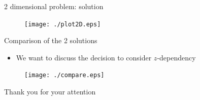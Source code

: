 \documentclass{beamer}
\begin{document}
\begin{frame}{2 dimensional problem: solution}

\begin{figure}[!h]
\centering
\texttt{[image: ./plot2D.eps]}
\end{figure}

\end{frame}


\begin{frame}{Comparison of the 2 solutions}
\begin{itemize}
\item We want to discuss the decision to consider $z$-dependency
\end{itemize}

\begin{figure}[!h]
\centering
\texttt{[image: ./compare.eps]}
\end{figure}
\end{frame}

\begin{frame}
\begin{center}
Thank you for your attention
\end{center}
\end{frame}
\end{document}
